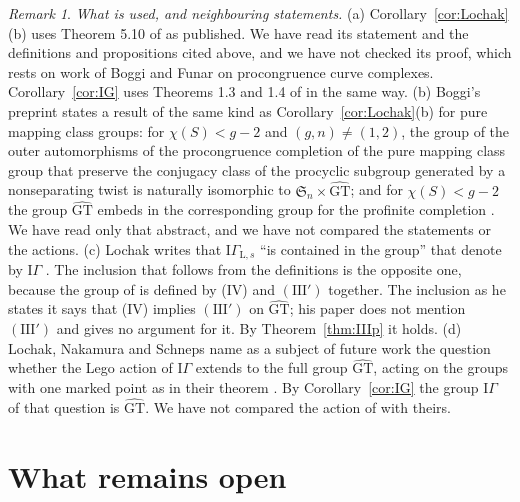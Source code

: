 \documentclass[11pt,a4paper]{article}
\theoremstyle{plain}
\theoremstyle{definition}
\theoremstyle{remark}
\newtheorem{remark}[theorem]{Remark}
\newcommand{\GT}{\widehat{\mathrm{GT}}}
\begin{document}
\begin{remark}\label{rem:context2}
\emph{What is used, and neighbouring statements.}
(a) Corollary~\ref{cor:Lochak}(b) uses Theorem 5.10 of \cite{Lo} as published. We have read its statement and the
definitions and propositions cited above, and we have not checked its proof, which rests on work of Boggi and Funar
on procongruence curve complexes. Corollary~\ref{cor:IG} uses Theorems 1.3 and 1.4 of \cite{NS} in the same way.
(b) Boggi's preprint \cite{Bo} states a result of the same kind as Corollary~\ref{cor:Lochak}(b) for pure mapping
class groups: for $\chi(S)<g-2$ and $(g,n)\ne(1,2)$, the group of the outer automorphisms of the procongruence
completion of the pure mapping class group that preserve the conjugacy class of the procyclic subgroup generated by a
nonseparating twist is naturally isomorphic to $\mathfrak S_n\times\GT$; and for $\chi(S)<g-2$ the group $\GT$
embeds in the corresponding group for the profinite completion \cite[abstract of version 6]{Bo}. We have read only
that abstract, and we have not compared the statements or the actions.
(c) Lochak writes that $\mathrm{I}\Gamma_{\mathrm L,s}$ ``is contained in the group'' that \cite{NS} denote by
$\mathrm{I}\Gamma$ \cite[p.~61]{Lo}. The inclusion that follows from the definitions is the opposite one, because the
group of \cite{NS} is defined by (IV) and $(\mathrm{III}')$ together. The inclusion as he states it says that (IV)
implies $(\mathrm{III}')$ on $\GT$; his paper does not mention $(\mathrm{III}')$ and gives no argument for it. By
Theorem~\ref{thm:IIIp} it holds.
(d) Lochak, Nakamura and Schneps name as a subject of future work the question whether the Lego action of
$\mathrm{I}\Gamma$ extends to the full group $\GT$, acting on the groups with one marked point as in their theorem
\cite[\S8]{LNS}. By Corollary~\ref{cor:IG} the group $\mathrm{I}\Gamma$ of that question is $\GT$. We have not
compared the action of \cite{NS} with theirs.
\end{remark}

\section{What remains open}
\end{document}
